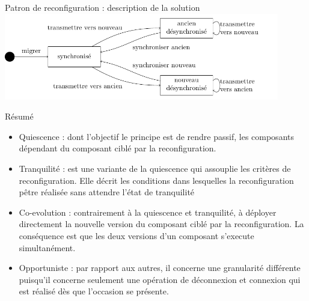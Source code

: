 \begin{frame}{Patron de reconfiguration : description de la solution}
\includegraphics[width=12cm]{imgs/slide_solution_coevolution.pdf}
\end{frame}

\begin{frame}{Résumé}
\begin{itemize}
\item Quiescence : dont l'objectif le principe est de rendre passif,
les composants dépendant du composant ciblé par la reconfiguration. 
\item Tranquilité : est une variante de la quiescence qui assouplie
les critères de reconfiguration. Elle décrit les conditions dans
lesquelles la reconfiguration pêtre réalisée sans attendre l'état de
tranquilité
\item Co-evolution : contrairement à la quiescence et tranquilité, à
déployer directement la nouvelle version du composant ciblé par la
reconfiguration. La conséquence est que les deux versions d'un
composant s'execute simultanément. 
\item Opportuniste : par rapport aux autres, il concerne une
granularité différente puisqu'il concerne seulement une opération de
déconnexion et connexion qui est réalisé dès que l'occasion se
présente.  
\end{itemize}
\end{frame}
